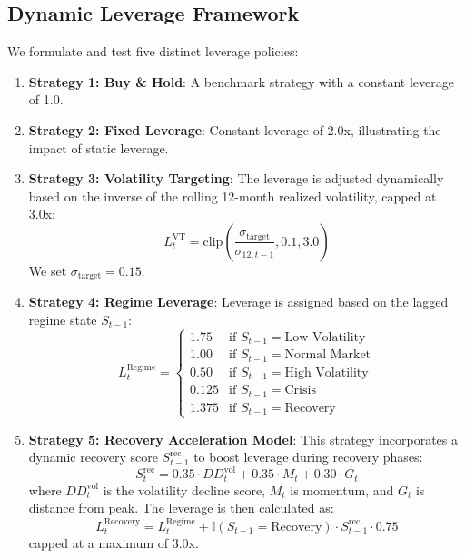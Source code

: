 \documentclass[11pt]{article}
\begin{document}
\subsection{Dynamic Leverage Framework}
We formulate and test five distinct leverage policies:
\begin{enumerate}
    \item \textbf{Strategy 1: Buy \& Hold}: A benchmark strategy with a constant leverage of 1.0.
    \item \textbf{Strategy 2: Fixed Leverage}: Constant leverage of 2.0x, illustrating the impact of static leverage.
    \item \textbf{Strategy 3: Volatility Targeting}: The leverage is adjusted dynamically based on the inverse of the rolling 12-month realized volatility, capped at 3.0x:
    \begin{equation}
    L_t^{\text{VT}} = \text{clip}\left(\frac{\sigma_{\text{target}}}{\sigma_{12, t-1}}, 0.1, 3.0\right)
    \end{equation}
    We set $\sigma_{\text{target}} = 0.15$.
    \item \textbf{Strategy 4: Regime Leverage}: Leverage is assigned based on the lagged regime state $S_{t-1}$:
    \begin{equation}
    L_t^{\text{Regime}} = \begin{cases}
    1.75 & \text{if } S_{t-1} = \text{Low Volatility} \\
    1.00 & \text{if } S_{t-1} = \text{Normal Market} \\
    0.50 & \text{if } S_{t-1} = \text{High Volatility} \\
    0.125 & \text{if } S_{t-1} = \text{Crisis} \\
    1.375 & \text{if } S_{t-1} = \text{Recovery}
    \end{cases}
    \end{equation}
    \item \textbf{Strategy 5: Recovery Acceleration Model}: This strategy incorporates a dynamic recovery score $S_{t-1}^{\text{rec}}$ to boost leverage during recovery phases:
    \begin{equation}
    S_t^{\text{rec}} = 0.35 \cdot DD^{\text{vol}}_t + 0.35 \cdot M_t + 0.30 \cdot G_t
    \end{equation}
    where $DD^{\text{vol}}_t$ is the volatility decline score, $M_t$ is momentum, and $G_t$ is distance from peak.
    The leverage is then calculated as:
    \begin{equation}
    L_t^{\text{Recovery}} = L_t^{\text{Regime}} + \mathbb{I}(S_{t-1} = \text{Recovery}) \cdot S_{t-1}^{\text{rec}} \cdot 0.75
    \end{equation}
    capped at a maximum of 3.0x.
\end{enumerate}
\end{document}
